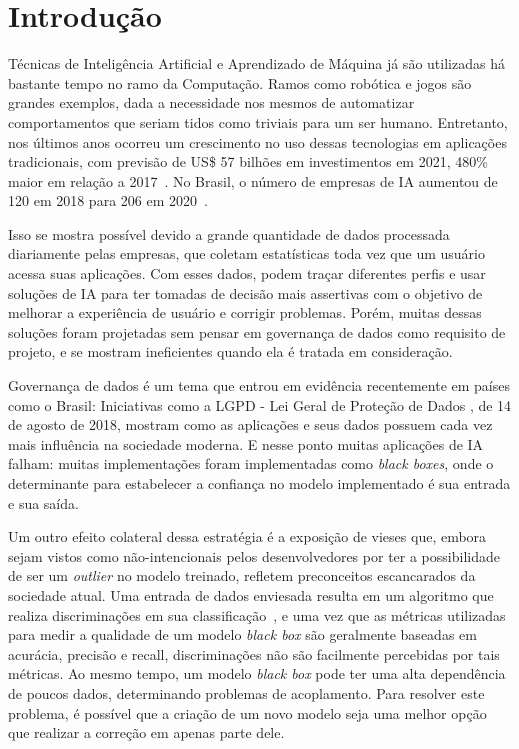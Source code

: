 \documentclass[portugues]{ic-tese}
\begin{document}


\tableofcontents


\mainmatter


\chapter{Introdução}


Técnicas de Inteligência Artificial e Aprendizado de Máquina já são utilizadas há bastante tempo no ramo da Computação. Ramos como robótica e jogos são grandes exemplos, dada a necessidade nos mesmos de automatizar comportamentos que seriam tidos como triviais para um ser humano. Entretanto, nos últimos anos ocorreu um crescimento no uso dessas tecnologias em aplicações tradicionais, com previsão de US\$ 57 bilhões em investimentos em 2021, 480\% maior em relação a 2017~\citep{Deloitte_2018}. No Brasil, o número de empresas de IA aumentou de 120 em 2018 para 206 em 2020~\citep{CIO_2021}.

Isso se mostra possível devido a grande quantidade de dados processada diariamente pelas empresas, que coletam estatísticas toda vez que um usuário acessa suas aplicações. Com esses dados, podem traçar diferentes perfis e usar soluções de IA para ter tomadas de decisão mais assertivas com o objetivo de melhorar a experiência de usuário e corrigir problemas. Porém, muitas dessas soluções foram projetadas sem pensar em governança de dados como requisito de projeto, e se mostram ineficientes quando ela é tratada em consideração.

Governança de dados é um tema que entrou em evidência recentemente em países como o Brasil: Iniciativas como a LGPD - Lei Geral de Proteção de Dados \citep{LGPD_2021}, de 14 de agosto de 2018, mostram como as aplicações e seus dados possuem cada vez mais influência na sociedade moderna. E nesse ponto muitas aplicações de IA falham: muitas implementações foram implementadas como \textit{black boxes}, onde o determinante para estabelecer a confiança no modelo implementado é sua entrada e sua saída.

Um outro efeito colateral dessa estratégia é a exposição de vieses que, embora sejam vistos como não-intencionais pelos desenvolvedores por ter a possibilidade de ser um \textit{outlier} no modelo treinado, refletem preconceitos escancarados da sociedade atual. Uma entrada de dados enviesada resulta em um algoritmo que realiza discriminações em sua classificação~\citep{Buolamwini_2018}, e uma vez que as métricas utilizadas para medir a qualidade de um modelo \textit{black box} são geralmente baseadas em acurácia, precisão e recall, discriminações não são facilmente percebidas por tais métricas. Ao mesmo tempo, um modelo \textit{black box} pode ter uma alta dependência de poucos dados, determinando problemas de acoplamento. Para resolver este problema, é possível que a criação de um novo modelo seja uma melhor opção que realizar a correção em apenas parte dele.
\end{document}
